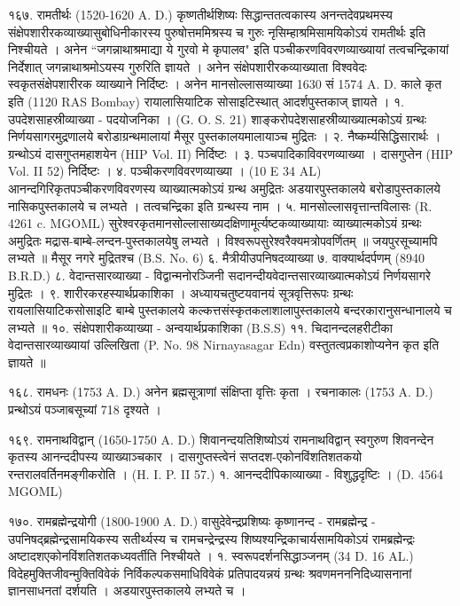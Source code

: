 १६७. रामतीर्थः (1520-1620 A. D.)
कृष्णतीर्थशिष्यः सिद्धान्ततत्वकास्य अनन्तदेवप्रथमस्य संक्षेपशारीरकव्याख्यासुबोधिनीकारस्य पुरुषोत्तममिश्रस्य च गुरुः नृसिम्हाश्रमिसामयिकोऽयं रामतीर्थः इति निश्चीयते । अनेन ``जगन्नाथाश्रमाद्या ये गुरवो मे कृपालव" इति पञ्चीकरणविवरणव्याख्यायां तत्वचन्द्रिकायां निर्देशात् जगन्नाथाश्रमोऽयस्य गुरुरिति ज्ञायते । अनेन संक्षेपशारीरकव्याख्याता विश्ववेदः स्वकृतसंक्षेपशारीरक व्याख्याने निर्दिष्टः । अनेन मानसोल्लासव्याख्या 1630 सं 1574 A. D. काले कृत इति (1120 RAS Bombay) रायालासियाटिक सोसाइटिस्थात् आदर्शपुस्तकाज् ज्ञायते ।
१. उपदेशसाहस्रीव्याख्या - पदयोजनिका । (G. O. S. 21)
शाङ्करोपदेशसाहस्रीव्याख्यात्मकोऽयं ग्रन्थः निर्णयसागरमुद्रणालये बरोडाग्रन्थमालायां मैसूर पुस्तकालयमालायाञ्च मुद्रितः ।
२. नैष्कर्म्यसिद्धिसारार्थः । ग्रन्थोऽयं दासगुप्तमहाशयेन (HIP Vol. II) निर्दिष्टः ।
३. पञ्चपादिकाविवरणव्याख्या । दासगुप्तेन (HIP Vol. II 52) निर्दिष्टः ।
४. पञ्चीकरणविवरणव्याख्या । (10 E 34 AL)
आनन्दगिरिकृतपञ्चीकरणविवरणस्य व्याख्यात्मकोऽयं ग्रन्थ अमुद्रितः अडयारपुस्तकालये बरोडापुस्तकालये नासिकपुस्तकालये च लभ्यते । तत्वचन्द्रिका इति ग्रन्थस्य नाम ।
५. मानसोल्लासवृत्तान्तविलासः (R. 4261 c. MGOML)
सुरेश्वरकृतमानसोल्लासाख्यदक्षिणामूर्त्यष्टकव्याख्यायाः व्याख्यात्मकोऽयं ग्रन्थः अमुद्रितः मद्रास-बाम्बे-लन्दन-पुस्तकालयेषु लभ्यते । विश्वरूपसुरेश्वरैक्यमत्रोपवर्णितम् ॥ जयपुरसूच्यामपि लभ्यते ॥ मैसूर नगरे मुद्रितश्च (B.S. No. 6) 
६. मैत्रीयीउपनिषदव्याख्या
७. वाक्यार्थदर्पणम् (8940 B.R.D.)
८. वेदान्तसारव्याख्या - विद्वान्मनोरञ्जिनी सदानन्दीयवेदान्तसारव्याख्यात्मकोऽयं निर्णयसागरे मुद्रितः ।
९. शारीरकरहस्यार्थप्रकाशिका । अध्यायचतुष्टयवानयं सूत्रवृत्तिरूपः ग्रन्थः रायलासियाटिकसोसाइटि बाम्बे पुस्तकालये कल्कत्तसंस्कृतकलाशालापुस्तकालये बन्दरकारानुसन्धानालये च लभ्यते ॥
१०. संक्षेपशारीकव्याख्या - अन्वयार्थप्रकाशिका (B.S.S)
११. चिदानन्दलहरीटीका वेदान्तसारव्याख्यायां उल्लिखिता (P. No. 98 Nirnayasagar Edn) वस्तुतत्वप्रकाशोप्यनेन कृत इति ज्ञायते ॥

१६८. रामधनः (1753 A. D.)
अनेन ब्रह्मसूत्राणां संक्षिप्ता वृत्तिः कृता । रचनाकालः (1753 A. D.) प्रन्थोऽयं पञ्जाबसूच्यां 718 दृश्यते ।

१६९. रामनाथविद्वान् (1650-1750 A. D.)
शिवानन्दयतिशिष्योऽयं रामनाथविद्वान् स्वगुरुण शिवनन्देन कृतस्य आनन्ददीपस्य व्याख्याञ्चकार । दासगुप्तस्त्वेनं सप्तदश-एकोनविंशतिशतकयो रन्तरालवर्तिनमङ्गीकरोति । (H. I. P. II 57.)
१. आनन्ददीपिकाव्याख्या - विशुद्धदृष्टिः । (D. 4564 MGOML)

१७०. रामब्रह्मेन्द्रयोगी (1800-1900 A. D.)
वासुदेवेन्द्रप्रशिष्यः कृष्णानन्द - रामब्रह्मेन्द्र - उपनिषद्ब्रह्मेन्द्रसामयिकस्य सतीर्थ्यस्य च रामचन्द्रेन्द्रस्य शिष्यश्यन्द्रिकाचार्यसामयिकोऽयं रामब्रह्मेन्द्रः अष्टादशएकोनविंशतिशतकध्यवर्तीति निश्चीयते ।
१. स्वरूपदर्शनसिद्धाञ्जनम् (34 D. 16 AL.)
विदेहमुक्तिजीवन्मुक्तिविवेकं निर्विकल्पकसमाधिविवेकं प्रतिपादयन्नयं ग्रन्थः श्रवणमनननिदिध्यासनानां ज्ञानसाधनतां दर्शयति । अडयारपुस्तकालये लभ्यते च ।

